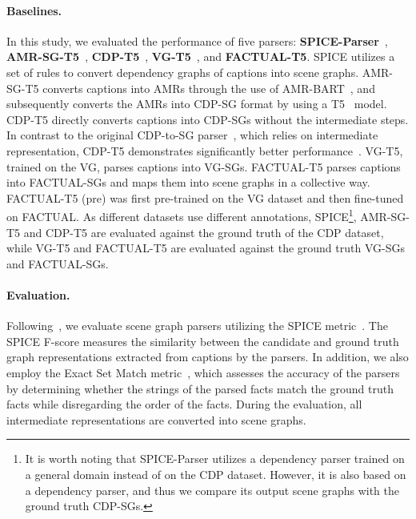 \paragraph{Baselines.} In this study, we evaluated the performance of five parsers: \textbf{SPICE-Parser}~\cite{anderson2016spice}, \textbf{AMR-SG-T5}~\cite{choi-etal-2022-scene}, \textbf{CDP-T5}~\cite{choi-etal-2022-scene}, \textbf{VG-T5}~\cite{sharifzadeh2022improving}, and \textbf{FACTUAL-T5}. SPICE utilizes a set of rules to convert dependency graphs of captions into scene graphs. AMR-SG-T5 converts captions into AMRs through the use of AMR-BART~\cite{bai-etal-2022-graph}, and subsequently converts the AMRs into CDP-SG format by using a T5~\cite{raffel2020exploring} model. CDP-T5 directly converts captions into CDP-SGs without the intermediate steps. In contrast to the original CDP-to-SG parser~\cite{wang2018scene}, which relies on intermediate representation, CDP-T5 demonstrates significantly better performance~\cite{choi-etal-2022-scene}. VG-T5, trained on the VG, parses captions into VG-SGs. FACTUAL-T5 parses captions into FACTUAL-SGs and maps them into scene graphs in a collective way. FACTUAL-T5 (pre) was first pre-trained on the VG dataset and then fine-tuned on FACTUAL. As different datasets use different annotations, SPICE\footnote{It is worth noting that SPICE-Parser utilizes a dependency parser trained on a general domain instead of on the CDP dataset. However, it is also based on a dependency parser, and thus we compare its output scene graphs with the ground truth CDP-SGs.}, AMR-SG-T5 and CDP-T5 are evaluated against the ground truth of the CDP dataset, while VG-T5 and FACTUAL-T5 are evaluated against the ground truth VG-SGs and FACTUAL-SGs.

\paragraph{Evaluation.} Following~\citet{schuster2015generating,wang2018scene,choi-etal-2022-scene}, we evaluate scene graph parsers utilizing the SPICE metric~\cite{anderson2016spice}. The SPICE F-score measures the similarity between the candidate and ground truth graph representations extracted from captions by the parsers. In addition, we also employ the Exact Set Match metric~\cite{yu2019sparc}, which assesses the accuracy of the parsers by determining whether the strings of the parsed facts match the ground truth facts while disregarding the order of the facts. During the evaluation, all intermediate representations are converted into scene graphs.


